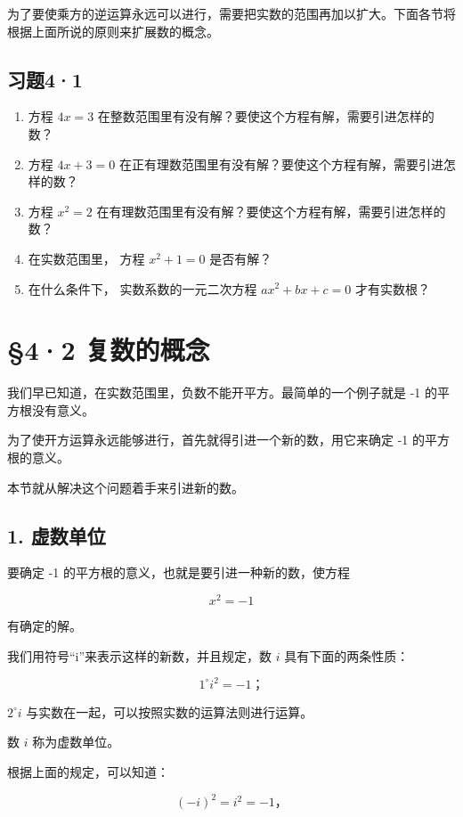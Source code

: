 为了要使乘方的逆运算永远可以进行，需要把实数的范围再加以扩大。下面各节将根据上面所说的原则来扩展数的概念。

\subsection{习题4·1}

\begin{enumerate}
\item
  方程 \(4x = 3\)
  在整数范围里有没有解？要使这个方程有解，需要引进怎样的数？
\item
  方程 \(4x + 3 = 0\)
  在正有理数范围里有没有解？要使这个方程有解，需要引进怎样的数？
\item
  方程 \(x^{2} = 2\)
  在有理数范围里有没有解？要使这个方程有解，需要引进怎样的数？
\item
  在实数范围里， 方程 \(x^{2} + 1 = 0\) 是否有解？
\item
  在什么条件下， 实数系数的一元二次方程 \(ax^2 + bx + c = 0\)
  才有实数根？
\end{enumerate}

\section{§4·2 复数的概念}

我们早已知道，在实数范围里，负数不能开平方。最简单的一个例子就是 -1
的平方根没有意义。

为了使开方运算永远能够进行，首先就得引进一个新的数，用它来确定 -1
的平方根的意义。

本节就从解决这个问题着手来引进新的数。

\subsection{1. 虚数单位}

要确定 -1 的平方根的意义，也就是要引进一种新的数，使方程

\[
x ^ {2} = - 1 \tag {1}
\]

有确定的解。

我们用符号``i''来表示这样的新数，并且规定，数 \(i\) 具有下面的两条性质：

\[
1 ^ {\circ} i ^ {2} = - 1\text{；}
\]

\(2^{\circ}i\) 与实数在一起，可以按照实数的运算法则进行运算。

数 \(i\) 称为虚数单位。

根据上面的规定，可以知道：

\[
(- i) ^ {2} = i ^ {2} = - 1\text{，}
\]

